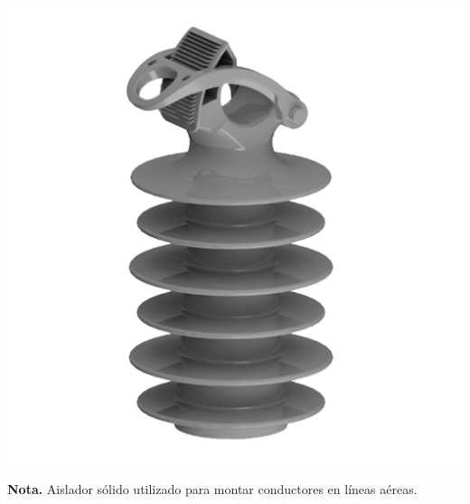 \begin{minipage}[t]{0.48\textwidth} %
    \centering
    \includegraphics[width=\linewidth]{fotosherrajes/Aislador tipo poste.png}
    \footnotesize
    \raggedright
    \textbf{Nota.} Aislador sólido utilizado para montar conductores en líneas aéreas.
\end{minipage}

\vspace{1cm} %

